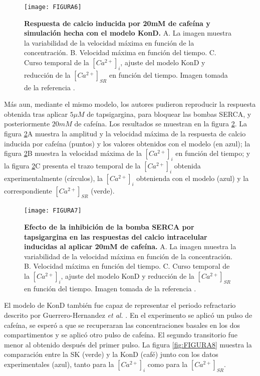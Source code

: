 \documentclass[draft]{article}
\newcommand{\Cai}{[Ca^{2+}]_{i}}
\newcommand{\Cal}{[Ca^{2+}]_{SR}}
\newcommand{\al}{\textit{et al.} }
\begin{document}
\begin{figure}[h]
	\centering
	\texttt{[image: FIGURA6]}
	\caption{\textbf{Respuesta de calcio inducida por 20mM de cafeína y simulación hecha con el modelo KonD.} A. La imagen muestra la variabilidad de la velocidad máxima en función de la concentración. B. Velocidad máxima en función del tiempo. C. Curso temporal de la $\Cai$, ajuste del modelo KonD y reducción de la $\Cal$ en función del tiempo. Imagen tomada de la referencia \cite{Perez-Rosas2015}.}
	\label{fig:FIGURA6}
\end{figure}

Más aun, mediante el mismo modelo, los autores pudieron reproducir la respuesta obtenida tras aplicar $5\mu M$ de tapsigargina, para bloquear las bombas SERCA, y posteriormente $20mM$ de cafeína. Los resultados se muestran en la figura \ref{fig:FIGURA7}. La figura \ref{fig:FIGURA7}A muestra la amplitud y la velocidad máxima de la respuesta de calcio inducida por cafeína (puntos) y los valores obtenidos con el modelo (en azul); la figura \ref{fig:FIGURA7}B muestra la velocidad máxima de la $\Cai$ en función del tiempo; y la figura \ref{fig:FIGURA7}C presenta el trazo temporal de la $\Cai$ obtenida experimentalmente (círculos), la $\Cai$ obtenienda con el modelo (azul) y la correspondiente $\Cal$ (verde). \\

\begin{figure}[h]
	\centering
	\texttt{[image: FIGURA7]}
	\caption{\textbf{Efecto de la inhibición de la bomba SERCA por tapsigargina en las respuestas del calcio intracelular inducidas al aplicar 20mM de cafeína.} A. La imagen muestra la variabilidad de la velocidad máxima en función de la concentración. B. Velocidad máxima en función del tiempo. C. Curso temporal de la $\Cai$, ajuste del modelo KonD y reducción de la $\Cal$ en función del tiempo. Imagen tomada de la referencia \cite{Perez-Rosas2015}.}
	\label{fig:FIGURA7}
\end{figure}

El modelo de KonD también fue capaz de representar el periodo refractario descrito por Guerrero-Hernandez \al \cite{Guerrero-Hernandez2010}. En el experimento se aplicó un pulso de cafeína, se esperó a que se recuperaran las concentraciones basales en los dos compartimentos y se aplicó otro pulso de cafeína. El segundo transitorio fue menor al obtenido después del primer pulso. La figura \ref{fig:FIGURA8} muestra la comparación entre la SK (verde) y la KonD (café) junto con los datos experimentales (azul), tanto para la $\Cai$ como para la $\Cal$. \\
\end{document}
